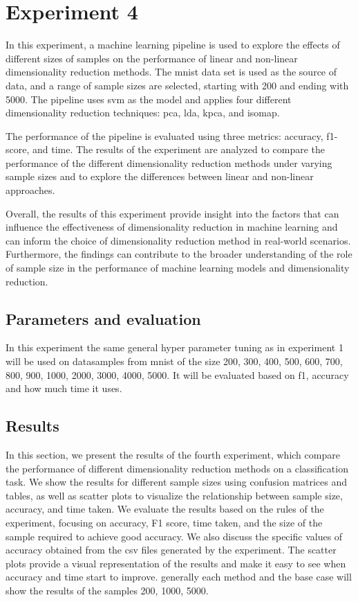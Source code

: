 \section{Experiment 4}\label{sec:experiment-4}

In this experiment, a machine learning pipeline is used to explore the effects of different sizes of samples on the performance of linear and non-linear dimensionality reduction methods. The \gls{mnist} data set is used as the source of data, and a range of sample sizes are selected, starting with 200 and ending with 5000. The pipeline uses \gls{svm} as the model and applies four different dimensionality reduction techniques: \gls{pca}, \gls{lda}, \gls{kpca}, and \gls{isomap}.

The performance of the pipeline is evaluated using three metrics: accuracy, f1-score, and time. The results of the experiment are analyzed to compare the performance of the different dimensionality reduction methods under varying sample sizes and to explore the differences between linear and non-linear approaches.

Overall, the results of this experiment provide insight into the factors that can influence the effectiveness of dimensionality reduction in machine learning and can inform the choice of dimensionality reduction method in real-world scenarios. Furthermore, the findings can contribute to the broader understanding of the role of sample size in the performance of machine learning models and dimensionality reduction.

\subsection{Parameters and evaluation}
In this experiment the same general hyper parameter tuning as in experiment 1 will be used on datasamples from \gls{mnist} of the size 200, 300, 400, 500, 600, 700, 800, 900, 1000, 2000, 3000, 4000, 5000. It will be evaluated based on f1, accuracy and how much time it uses.




\subsection{Results}\label{subsec:experiment_4_results}
In this section, we present the results of the fourth experiment, which compare the performance of different dimensionality reduction methods on a classification task. We show the results for different sample sizes using confusion matrices and tables, as well as scatter plots to visualize the relationship between sample size, accuracy, and time taken. We evaluate the results based on the rules of the experiment, focusing on accuracy, F1 score, time taken, and the size of the sample required to achieve good accuracy. We also discuss the specific values of accuracy obtained from the csv files generated by the experiment. The scatter plots provide a visual representation of the results and make it easy to see when accuracy and time start to improve. generally each method and the base case will show the results of the samples 200, 1000, 5000.

